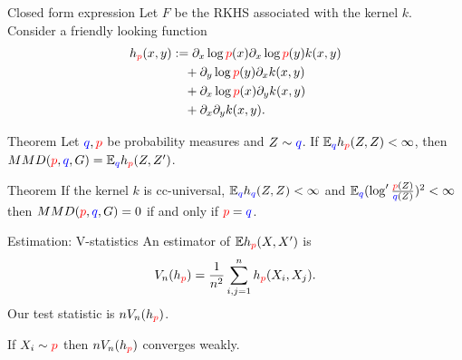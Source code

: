 \begin{frame}
\begin{columns}
\hspace{-1.45cm}
\begin{column}{.33\linewidth}

\vspace{-0.75cm}
\begin{block}{Closed form expression}
 Let $F$ be the RKHS associated with the kernel $k$. Consider a friendly looking function
\begin{align*}
h_{{\color{red} p}}(x,y) & := \partial_{x} \log {\color{red} p}(x) \partial_{x} \log {\color{red} p}(y) k(x,y)\\
 & \quad+\partial_{y} \log {\color{red} p}(y) \partial_{x}  k(x,y)\\
 & \quad+\partial_{x} \log {\color{red} p}(x) \partial_{y}k(x,y)\\
 & \quad+\partial_{x} \partial_{y} k(x,y).
\end{align*}
 
\end{block}

\vspace{-0.75cm}
\begin{block}{Theorem}
Let ${ \color{blue} q},{\color{red} p}$ be probability measures and $Z\sim { \color{blue} q}$. 
If $\mathbb{E}_{{ \color{blue} q}} h_{{\color{red} p}}(Z,Z)<\infty$, then $MMD({\color{red} p},{ \color{blue} q},G) = \mathbb{E}_{{ \color{blue} q}} h_{{\color{red} p}}(Z,Z')$.
\end{block}
\vspace{-0.75cm}
\begin{block}{Theorem}
 If the kernel $k$ is cc-universal, $\mathbb{E}_{{ \color{blue} q}} h_{{ \color{blue} q}}(Z,Z)<\infty$ and $\mathbb{E}_{{ \color{blue} q}} (\log' \frac{{\color{red} p}(Z)}{{ \color{blue} q}(Z)})^{2}<\infty$
then $MMD({\color{red} p},{ \color{blue} q},G) =0$ if and only if ${\color{red} p}={ \color{blue} q}$.

\end{block}
\vspace{-0.75cm}
\begin{block}{Estimation: V-statistics}
An estimator of $\mathbb{E} h_{\color{red} p}(X,X')$ is
\begin{align*}
 V_n(h_{\color{red} p}) = \frac {1} {n^2} \sum_{i,j=1}^n h_{\color{red} p}(X_i,X_j).
\end{align*}
Our test statistic is $ n V_n(h_{\color{red} p})$.

If $X_i \sim {\color{red} p}$ then $ n V_n(h_{\color{red} p})$  converges weakly. 


\end{block}
\end{column}
\end{columns}
\end{frame}
